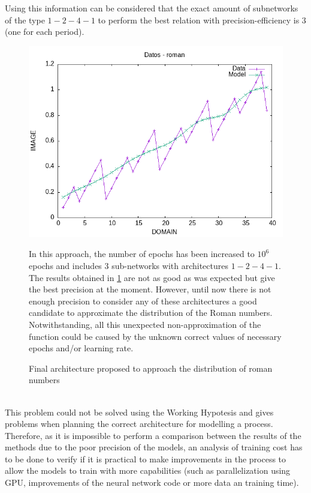 \documentclass[a4paper, 11pt]{article}
\begin{document}
Using this information can be considered that the exact amount of subnetworks of the type $1-2-4-1$ to perform the best relation with precision-efficiency is $3$ (one for each period).
\begin{figure}[h]
    \begin{minipage}{5.5cm}
        \begin{center}
            \includegraphics[width = 1 \linewidth]{img/roman/roman_over_kill.png}
            \caption{Final architecture proposed to approach the distribution of roman numbers}
            \label{overkill-approach}
        \end{center}
    \end{minipage} \hspace{1em}
    \begin{minipage}{9cm}
        In this approach, the number of epochs has been increased to $10^6$ epochs and includes $3$ sub-networks with architectures $1-2-4-1$.
        The results obtained in \ref{overkill-approach} are not as good as was expected but give the best precision at the moment.
        However, until now there is not enough precision to consider any of these architectures a good candidate to approximate the distribution of the Roman numbers.
        Notwithstanding, all this unexpected non-approximation of the function could be caused by the unknown correct values of necessary epochs and/or learning rate.
    \end{minipage}
\end{figure}\\
This problem could not be solved using the Working Hypotesis and gives problems when planning the correct architecture for modelling a process.\\
Therefore, as it is impossible to perform a comparison between the results of the methods due to the poor precision of the models, an analysis of training cost has to be done to verify if it is practical to make improvements in the process to allow the models to train with more capabilities (such as parallelization using GPU, improvements of the neural network code or more data an training time). 
\end{document}
